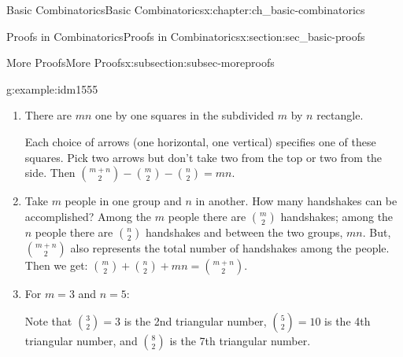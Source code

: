 \documentclass[oneside,10pt,]{book}
\numberwithin{equation}{chapter}
\begin{document}
\begin{chapterptx}{Basic Combinatorics}{}{Basic Combinatorics}{}{}{x:chapter:ch_basic-combinatorics}
\begin{sectionptx}{Proofs in Combinatorics}{}{Proofs in Combinatorics}{}{}{x:section:sec_basic-proofs}
\begin{subsectionptx}{More Proofs}{}{More Proofs}{}{}{x:subsection:subsec-moreproofs}
\begin{example}{}{g:example:idm1555}
\begin{enumerate}
\begin{sidebyside}{2}{0.025}{0.025}{0.05}
\begin{sbspanel}{0.7}[center]
Since we really want only lines that are formed by connecting the \(m\) points with the \(n\) points, we could say we have \(mn\) lines. Or we could consider all \(m + n\) points and pick 2 in \(\binom{m+n}{2}\) ways and then delete those choices where you took 2 from \(m\) or 2 from \(n\), since these formed vertical and horizontal lines, respectively.  Thus \(\binom{m + n}{2} - \binom{m}{2} - \binom{n}{2} = mn\).%
\end{sbspanel}%
\end{sidebyside}%
\item{}There are \(mn\) one by one squares in the subdivided \(m\) by \(n\) rectangle.%
\begin{sidebyside}{2}{0}{0}{0.1}%
\begin{sbspanel}{0.7}%
Each choice of arrows (one horizontal, one vertical) specifies one of these squares.  Pick two arrows but don't take two from the top or two from the side.  Then \(\binom{m + n}{2} - \binom{m}{2} - \binom{n}{2} = mn\).%
\end{sbspanel}%
\begin{sbspanel}{0.2}%
%
\end{sbspanel}%
\end{sidebyside}%
\item{}Take \(m\) people in one group and \(n\) in another. How many handshakes can be accomplished? Among the \(m\) people there are \(\binom{m}{2}\) handshakes; among the \(n\) people there are \(\binom{n}{2}\) handshakes and between the two groups, \(mn\). But, \(\binom{m + n}{2}\) also represents the total number of handshakes among the people. Then we get: \(\binom{m}{2} + \binom{n}{2} + mn = \binom{m + n}{2}\).%
\item{}For \(m = 3\) and \(n = 5\):%
\begin{image}{0.35}{0.3}{0.35}%
%
\end{image}%
Note that \(\binom{3}{2} = 3\) is the 2nd triangular number, \(\binom{5}{2} = 10\) is the 4th triangular number, and \(\binom{8}{2}\) is the 7th triangular number.%

\end{enumerate}
\end{example}
\end{subsectionptx}
\end{sectionptx}
\end{chapterptx}
\end{document}
